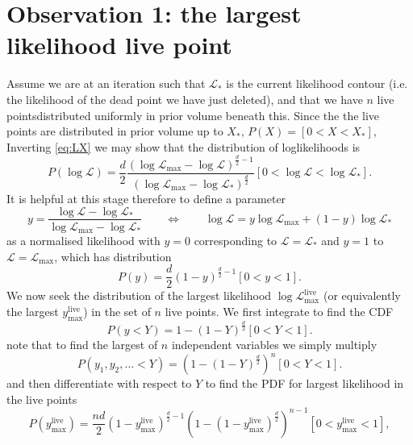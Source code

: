 \documentclass[usenatbib]{mnras} %
\begin{document}
\section*{Observation 1: the largest likelihood live point}
Assume we are at an iteration such that $\mathcal{L}_*$ is the current likelihood contour (i.e. the likelihood of the dead point we have just deleted), and that we have $n$ live pointsdistributed uniformly in prior volume beneath this. 
Since the the live points are distributed in prior volume up to $X_*$, $P(X) = [0<X<X_*]$,
Inverting \cref{eq:LX} we may show that the distribution of loglikelihoods is
\begin{equation}
    P(\log\mathcal{L}) = \frac{d}{2}\frac{(\log\mathcal{L}_\mathrm{max}-\log\mathcal{L})^{\frac{d}{2}-1}}{(\log\mathcal{L}_\mathrm{max}-\log\mathcal{L}_*)^{\frac{d}{2}}}[0<\log\mathcal{L}<\log\mathcal{L}_*].
    \label{eq:PL}
\end{equation}
It is helpful at this stage therefore to define a parameter
\begin{equation}
    y = \frac{\log\mathcal{L}-\log\mathcal{L}_*}{\log\mathcal{L}_\mathrm{max}-\log\mathcal{L}_*} \qquad\Leftrightarrow\qquad \log\mathcal{L} = y\log\mathcal{L}_\mathrm{max} + (1-y)\log\mathcal{L}_*
    \label{eq:y}
\end{equation}
as a normalised likelihood with $y=0$ corresponding to $\mathcal{L}=\mathcal{L}_*$ and $y=1$ to $\mathcal{L}=\mathcal{L}_\mathrm{max}$, which has distribution
\begin{equation}
    P(y) = \frac{d}{2}(1-y)^{\frac{d}{2}-1}[0<y<1].
    \label{eq:Py}
\end{equation}
We now seek the distribution of the largest likelihood $\log{\mathcal{L}}_\mathrm{max}^\mathrm{live}$ (or equivalently the largest ${y}_\mathrm{max}^\mathrm{live}$) in the set of $n$ live points. We first integrate to find the CDF
\begin{equation}
    P(y<Y) = 1-(1-Y)^{\frac{d}{2}}[0<Y<1].
    \label{eq:Py}
\end{equation}
note that to find the largest of $n$ independent variables we simply multiply 
\begin{equation}
    P(y_1,y_2,\ldots<Y) = (1-(1-Y)^{\frac{d}{2}})^n[0<Y<1].
    \label{eq:Py}
\end{equation}
and then differentiate with respect to $Y$ to find the PDF for largest likelihood in the live points
\begin{equation}
    P(y_\mathrm{max}^\mathrm{live}) = \frac{nd}{2}(1-y_\mathrm{max}^\mathrm{live})^{\frac{d}{2}-1}\left(1-(1-y_\mathrm{max}^\mathrm{live})^{\frac{d}{2}}\right)^{n-1}[0<y_\mathrm{max}^\mathrm{live}<1],
    \label{eq:Pyhat}
\end{equation}
\end{document}
